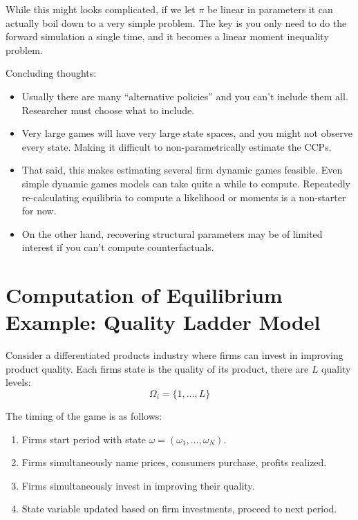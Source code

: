 \documentclass[twoside]{article}
\begin{document}
While this might looks complicated, if we let $\pi$ be linear in parameters it can actually boil down to a very simple problem. The key is you only need to do the forward simulation a single time, and it becomes a linear moment inequality problem. 

Concluding thoughts: 
\begin{itemize} 

\item Usually there are many ``alternative policies'' and you can't include them all. Researcher must choose what to include. 

\item Very large games will have very large state spaces, and you might not observe every state. Making it difficult to non-parametrically estimate the CCPs. 

\item That said, this makes estimating several firm dynamic games feasible.  Even simple dynamic games models can take quite a while to compute. Repeatedly re-calculating equilibria to compute a likelihood or moments is a non-starter for now. 

\item On the other hand, recovering structural parameters may be of limited interest if you can't compute counterfactuals. 

\end{itemize}

\section{Computation of Equilibrium Example: Quality Ladder Model}

Consider a differentiated products industry where firms can invest in improving product quality. Each firms state is the quality of its product, there are $L$ quality levels:
$$\Omega_i = \{ 1, \ldots, L \}$$

The timing of the game is as follows: 
\begin{enumerate}
\item Firms start period with state $\omega = (\omega_1, \ldots, \omega_N)$.
\item Firms simultaneously name prices, consumers purchase, profits realized. 
\item Firms simultaneously invest in improving their quality. 
\item State variable updated based on firm investments, proceed to next period.
\end{enumerate}
\end{document}
